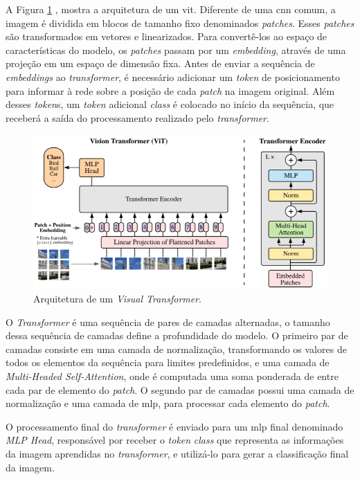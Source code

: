 A Figura \ref{fig:vit_arch} \cite{vit}, mostra a arquitetura de um \acrshort{vit}. 
Diferente de uma \acrshort{cnn} comum, a imagem é dividida em blocos de tamanho fixo denominados \textit{patches}. 
Esses \textit{patches} são transformados em vetores e linearizados. 
Para convertê-los ao espaço de características do modelo, os \textit{patches} passam por um \textit{embedding}, através de uma projeção em um espaço de dimensão fixa. 
Antes de enviar a sequência de \textit{embeddings} ao \textit{transformer}, 
é necessário adicionar um \textit{token} de posicionamento para informar à rede sobre a posição de cada \textit{patch} na imagem original. 
Além desses \textit{token}s, um \textit{token} adicional \textit{class} é colocado no início da sequência, que receberá a saída do processamento realizado pelo \textit{transformer}.

\begin{figure}[htb]
\centerline{\includegraphics[width=1\linewidth]{images/visual transformer.png}}
\caption{Arquitetura de um \textit{Visual Transformer}\cite{vit}.}
\label{fig:vit_arch}
\end{figure}

O \textit{Transformer} é uma sequência de pares de camadas alternadas, o tamanho dessa sequência de camadas define a profundidade do modelo. 
O primeiro par de camadas consiste em uma camada de normalização, transformando os valores de todos os elementos da sequência para limites predefinidos, e uma camada de \textit{Multi-Headed Self-Attention}, onde é computada uma soma ponderada de entre cada par de elemento do \textit{patch}.
O segundo par de camadas possui uma camada de normalização e uma camada de \acrshort{mlp}, para processar cada elemento do \textit{patch}.

O processamento final do \textit{transformer} é enviado para um \acrshort{mlp} final denominado \textit{MLP Head}, responsável por receber o \textit{token} \textit{class} que representa as informações da imagem aprendidas no \textit{transformer}, e utilizá-lo para gerar a classificação final da imagem.